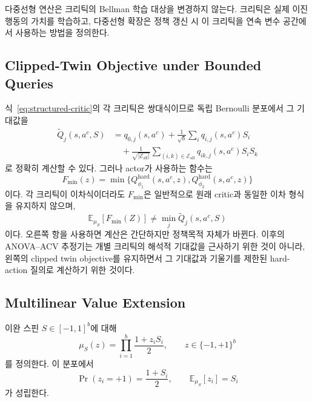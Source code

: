 \documentclass[10pt,journal]{IEEEtran}
\newcommand{\E}{\mathbb{E}}
\begin{document}
다중선형 연산은 크리틱의 Bellman 학습 대상을 변경하지 않는다. 크리틱은 실제 이진 행동의 가치를 학습하고, 다중선형 확장은 정책 갱신 시 이 크리틱을 연속 변수 공간에서 사용하는 방법을 정의한다.

\subsection{Clipped-Twin Objective under Bounded Queries}

식~\eqref{eq:structured-critic}의 각 크리틱은 쌍대식이므로 독립 Bernoulli 분포에서 그 기대값을
\begin{align}
\widetilde Q_j(s,a^c,S)
&=q_{0,j}(s,a^c)
+\frac{1}{\sqrt b}\sum_i q_{i,j}(s,a^c)S_i
\nonumber\\
&\quad+\frac{1}{\sqrt{|\mathcal E_{\mathrm{all}}|}}
\sum_{(i,k)\in\mathcal E_{\mathrm{all}}}
q_{ik,j}(s,a^c)S_iS_k
\label{eq:analytic-single-critic}
\end{align}
로 정확히 계산할 수 있다. 그러나 actor가 사용하는 함수는
\begin{equation}
F_{\min}(z)=\min\{Q_{\phi_1}^{\mathrm{hard}}(s,a^c,z),
Q_{\phi_2}^{\mathrm{hard}}(s,a^c,z)\}
\label{eq:clipped-hard-value}
\end{equation}
이다. 각 크리틱이 이차식이더라도 $F_{\min}$은 일반적으로 원래 critic과 동일한 이차 형식을 유지하지 않으며,
\begin{equation}
\E_{\mu_S}[F_{\min}(Z)]
\neq
\min_j\widetilde Q_j(s,a^c,S)
\label{eq:min-expectation-gap}
\end{equation}
이다. 오른쪽 항을 사용하면 계산은 간단하지만 정책목적 자체가 바뀐다. 이후의 ANOVA--ACV 추정기는 개별 크리틱의 해석적 기대값을 근사하기 위한 것이 아니라, 왼쪽의 clipped twin objective를 유지하면서 그 기대값과 기울기를 제한된 hard-action 질의로 계산하기 위한 것이다.


\subsection{Multilinear Value Extension}

이완 스핀 $S\in[-1,1]^b$에 대해
\begin{equation}
\mu_S(z)
=
\prod_{i=1}^{b}
\frac{1+z_iS_i}{2},
\qquad
z\in\{-1,+1\}^b
\label{eq:bernoulli-measure}
\end{equation}
를 정의한다. 이 분포에서
\begin{equation}
\Pr(z_i=+1)=\frac{1+S_i}{2},
\qquad
\E_{\mu_S}[z_i]=S_i
\end{equation}
가 성립한다.
\end{document}
